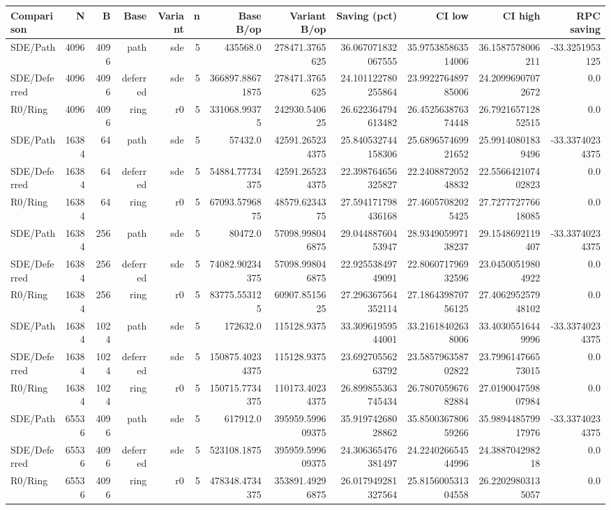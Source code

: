 \begin{tabular}{lrrrrrrrrrrr}
\toprule
Comparison & N & B & Base & Variant & n & Base B/op & Variant B/op & Saving (pct) & CI low & CI high & RPC saving \\
\midrule
SDE/Path & 4096 & 4096 & path & sde & 5 & 435568.0 & 278471.3765625 & 36.067071832067555 & 35.975385863514006 & 36.1587578006211 & -33.3251953125 \\
SDE/Deferred & 4096 & 4096 & deferred & sde & 5 & 366897.88671875 & 278471.3765625 & 24.101122780255864 & 23.992276489785006 & 24.20996907072672 & 0.0 \\
R0/Ring & 4096 & 4096 & ring & r0 & 5 & 331068.99375 & 242930.540625 & 26.622364794613482 & 26.452563876374448 & 26.792165712852515 & 0.0 \\
SDE/Path & 16384 & 64 & path & sde & 5 & 57432.0 & 42591.265234375 & 25.840532744158306 & 25.689657469921652 & 25.99140801839496 & -33.33740234375 \\
SDE/Deferred & 16384 & 64 & deferred & sde & 5 & 54884.77734375 & 42591.265234375 & 22.398764656325827 & 22.240887205248832 & 22.556642107402823 & 0.0 \\
R0/Ring & 16384 & 64 & ring & r0 & 5 & 67093.5796875 & 48579.6234375 & 27.594171798436168 & 27.46057082025425 & 27.727772776618085 & 0.0 \\
SDE/Path & 16384 & 256 & path & sde & 5 & 80472.0 & 57098.998046875 & 29.04488760453947 & 28.934905997138237 & 29.1548692119407 & -33.33740234375 \\
SDE/Deferred & 16384 & 256 & deferred & sde & 5 & 74082.90234375 & 57098.998046875 & 22.92553849749091 & 22.806071796932596 & 23.04500519804922 & 0.0 \\
R0/Ring & 16384 & 256 & ring & r0 & 5 & 83775.553125 & 60907.8515625 & 27.296367564352114 & 27.186439870756125 & 27.406295257948102 & 0.0 \\
SDE/Path & 16384 & 1024 & path & sde & 5 & 172632.0 & 115128.9375 & 33.30961959544001 & 33.21618402638006 & 33.40305516449996 & -33.33740234375 \\
SDE/Deferred & 16384 & 1024 & deferred & sde & 5 & 150875.40234375 & 115128.9375 & 23.69270556263792 & 23.585796358702822 & 23.799614766573015 & 0.0 \\
R0/Ring & 16384 & 1024 & ring & r0 & 5 & 150715.7734375 & 110173.40234375 & 26.899855363745434 & 26.780705967682884 & 27.019004759807984 & 0.0 \\
SDE/Path & 65536 & 4096 & path & sde & 5 & 617912.0 & 395959.599609375 & 35.91974268028862 & 35.850036780659266 & 35.989448579917976 & -33.33740234375 \\
SDE/Deferred & 65536 & 4096 & deferred & sde & 5 & 523108.1875 & 395959.599609375 & 24.306365476381497 & 24.224026654544996 & 24.388704298218 & 0.0 \\
R0/Ring & 65536 & 4096 & ring & r0 & 5 & 478348.4734375 & 353891.49296875 & 26.017949281327564 & 25.815600531304558 & 26.22029803135057 & 0.0 \\
\bottomrule
\end{tabular}
